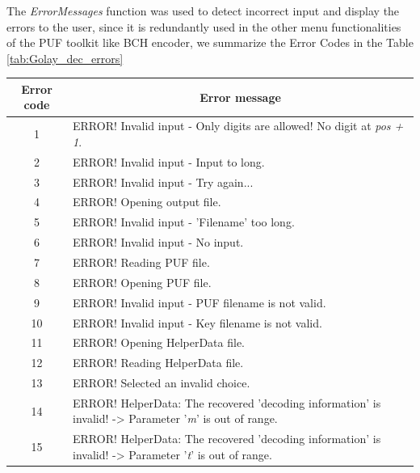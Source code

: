 	The \emph{ErrorMessages} function was used to detect incorrect input and display the errors to the user, since it is redundantly used in the other menu functionalities of the PUF toolkit like BCH encoder, we summarize the Error Codes in the Table \ref{tab:Golay_dec_errors}

	\begin{table}[!ht]
	\begin{center}
	\begin{tabular}{cp{13cm}}
	\toprule
	\multicolumn{1}{c}{\textbf{Error code}} & \multicolumn{1}{c}{\textbf{Error message}} \\
	\midrule
	\hline
	1 & ERROR! Invalid input - Only digits are allowed! No digit at \emph{pos + 1}.\\

	2 & ERROR! Invalid input - Input to long. \\

	3 & ERROR! Invalid input - Try again...  \\

	4 & ERROR! Opening output file. \\

	5 & ERROR! Invalid input - 'Filename' too long. \\

	6 & ERROR! Invalid input - No input. \\

	7 & ERROR! Reading PUF file. \\

	8 & ERROR! Opening PUF file. \\

	9 & ERROR! Invalid input - PUF filename is not valid.\\

	10 & ERROR! Invalid input - Key filename is not valid.\\

	11 & ERROR! Opening HelperData file. \\

	12 & ERROR! Reading HelperData file. \\

	13 & ERROR! Selected an invalid choice. \\

	14 & ERROR! HelperData: The recovered 'decoding information' is invalid! -> Parameter '\emph{m}' is out of range.\\

	15 & ERROR! HelperData: The recovered 'decoding information' is invalid! -> Parameter '\emph{t}' is out of range.\\


\end{tabular}
\end{center}
\end{table}
